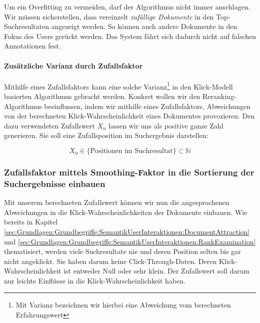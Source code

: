 Um ein Overfitting zu vermeiden, darf der Algorithmus nicht immer anschlagen. Wir müssen sicherstellen, dass vereinzelt \textit{zufällige Dokumente} in den \glqq Top-Suchresultaten\grqq{} angezeigt werden. So können auch andere Dokumente in den Fokus des Users gerückt werden. Das System fährt sich dadurch nicht auf falschen Annotationen fest. 

\paragraph{Zusätzliche Varianz durch Zufallsfaktor} 
Mithilfe eines Zufallsfaktors kann eine solche Varianz\footnote{Mit Varianz bezeichnen wir hierbei eine Abweichung vom berechneten Erfahrungswert} in den Klick-Modell basierten Algorithmus gebracht werden. Konkret wollen wir den Reranking-Algorithmus beeinflussen, indem wir mithilfe eines Zufallsfaktors, Abweichungen von der berechneten Klick-Wahrscheinlichkeit eines Dokumentes provozieren. Den dazu verwendeten Zufallswert $X_{u}$  lassen wir uns als positive ganze Zahl generieren. Sie soll eine Zufallsposition im Suchergebnis darstellen:

\vspace{-1.5em}
\begin{equation}	
	X_{u} \in \lbrace \text{Positionen im Suchresultat} \rbrace \subset \mathbb{N}
\end{equation}
\vspace{-1.5em}

\subsubsection{Zufallsfaktor mittels Smoothing-Faktor in 	die Sortierung der Suchergebnisse einbauen}
\label{sec:Reranking:Methodik:Vergessen:ZufallsfaktorSmoothing}

Mit unserem berechneten Zufallswert können wir nun die angesprochenen Abweichungen in die Klick-Wahrscheinlichkeiten der Dokumente einbauen. Wie bereits in Kapitel \ref{sec:Grundlagen:Grundbegriffe:SemantikUserInteraktionen:DocumentAttraction} und \ref{sec:Grundlagen:Grundbegriffe:SemantikUserInteraktionen:RankExamination} thematisiert, werden viele Suchresultate nie und deren Position selten bis gar nicht angeklickt. Sie haben darum keine Click-Through-Daten. Deren Klick-Wahrscheinlichkeit ist entweder Null oder sehr klein. Der Zufallswert soll darum nur leichte Einflüsse in die Klick-Wahrscheinlichkeit haben.

